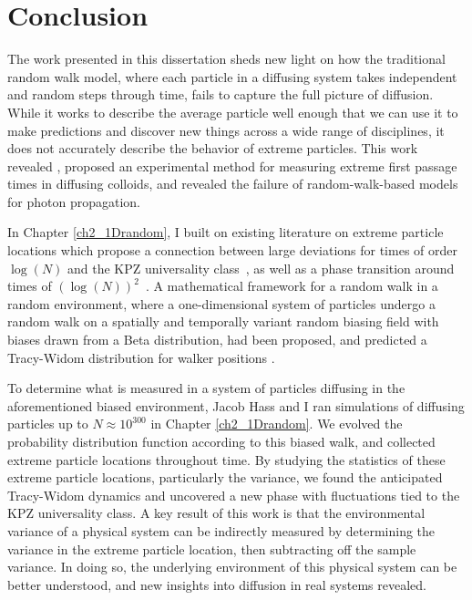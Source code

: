 \chapter{Conclusion}

The work presented in this dissertation sheds new light on how the traditional random walk model, where each particle in a diffusing system takes independent and random steps through time, fails to capture the full picture of diffusion. While it works to describe the average particle well enough that we can use it to make predictions and discover new things across a wide range of disciplines, it does not accurately describe the behavior of extreme particles. This work revealed , proposed an experimental method for measuring extreme first passage times in diffusing colloids, and revealed the failure of random-walk-based models for photon propagation.

In Chapter \ref{ch2_1Drandom}, I built on existing literature on extreme particle locations which propose a connection between large deviations for times of order $\log(N)$ and the KPZ universality class~\cite{corwin_kardar_2012,quastel_one-dimensional_2015,kardar_dynamic_1986}, as well as a phase transition around times of $(\log(N))^2$~\cite{le_doussal_diffusion_2017}. A mathematical framework for a random walk in a random environment, where a one-dimensional system of particles undergo a random walk on a spatially and temporally variant random biasing field with biases drawn from a Beta distribution, had been proposed, and predicted a Tracy-Widom distribution for walker positions .

To determine what is measured in a system of particles diffusing in the aforementioned biased environment, Jacob Hass and I ran simulations of diffusing particles up to $N\approx10^{300}$ \acg{[$=$?]} in Chapter \ref{ch2_1Drandom}. We evolved the probability distribution function according to this biased walk, and collected extreme particle locations throughout time. By studying the statistics of these extreme particle locations, particularly the variance, we found the anticipated Tracy-Widom dynamics and uncovered a new phase with fluctuations tied to the KPZ universality class. A key result of this work is that the environmental variance of a physical system can be indirectly measured by determining the variance in the extreme particle location, then subtracting off the sample variance. In doing so, the underlying environment of this physical system can be better understood, and new insights into diffusion in real systems revealed.

